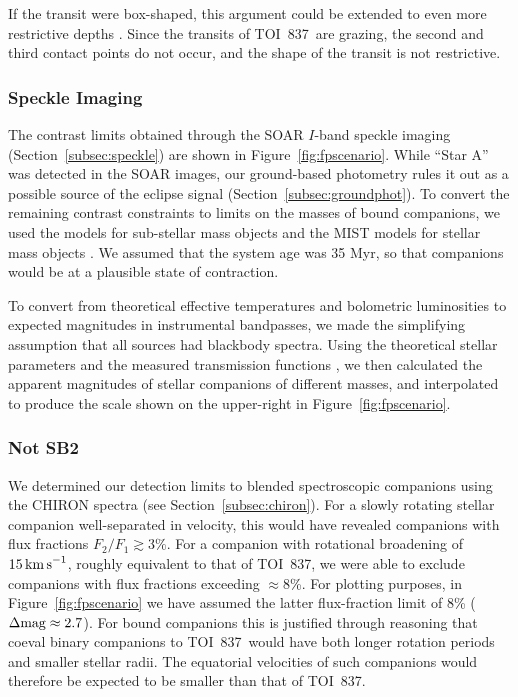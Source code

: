 \documentclass[12pt,twocolumn,tighten]{aastex63}
\newcommand{\tn}{TOI~837} %
\begin{document}
If the transit were box-shaped, this argument could be extended to
even more restrictive depths \citep[{\it
e.g.},][]{seager_unique_2003,vanderburg_hr858_2019,rizzuto_tess_2020}.
Since the transits of \tn\ are grazing, the second and third
contact points do not occur, and the shape of the transit is not
restrictive.

\subsubsection{Speckle Imaging}
The contrast limits obtained through the SOAR $I$-band speckle imaging
(Section~\ref{subsec:speckle}) are shown in
Figure~\ref{fig:fpscenario}.  While ``Star A'' was detected in the
SOAR images, our ground-based photometry rules it out as a possible
source of the eclipse signal (Section~\ref{subsec:groundphot}).  To
convert the remaining contrast constraints to limits on the masses of
bound companions, we used the \citet{baraffe_evolutionary_2003} models
for sub-stellar mass objects and the MIST models for stellar mass
objects
\citep{paxton_modules_2011,paxton_modules_2013,paxton_modules_2015,dotter_mesa_2016,choi_mesa_2016}.
We assumed that the system age was 35 Myr, so that companions would be
at a plausible state of contraction.

To convert from theoretical effective temperatures and bolometric
luminosities to expected magnitudes in instrumental bandpasses, we
made the simplifying assumption that all sources had blackbody spectra.
Using the theoretical stellar parameters and the measured transmission
functions \citep{tokovinin_ten_2018}, we then calculated the apparent
magnitudes of stellar companions of different masses, and interpolated
to produce the scale shown on the upper-right in
Figure~\ref{fig:fpscenario}.

\subsubsection{Not SB2}
We determined our detection limits to blended spectroscopic companions
using the CHIRON spectra (see Section~\ref{subsec:chiron}).  For a
slowly rotating stellar companion well-separated in velocity, this
would have revealed companions with flux fractions $F_2/F_1 \gtrsim
3\%$.  For a companion with rotational broadening of $15\,{\rm
km\,s}^{-1}$, roughly equivalent to that of \tn, we were able to
exclude companions with flux fractions exceeding $\approx$8\%.  For
plotting purposes, in Figure~\ref{fig:fpscenario} we have assumed the
latter flux-fraction limit of 8\% ($\Delta {\rm mag} \approx 2.7$).
For bound companions this is justified through reasoning that coeval
binary companions to \tn\ would have both longer rotation periods and
smaller stellar radii. The equatorial velocities of such companions
would therefore be expected to be smaller than that of \tn.
\end{document}
